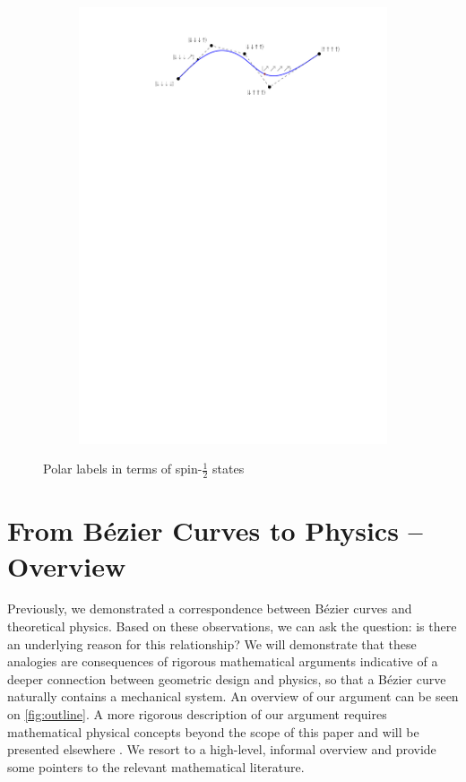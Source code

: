 \documentclass[final,3p,mathptmx]{elsarticle}
\begin{document}
\begin{figure}[h]
	\centering
	\begin{subfigure}{0.6\textwidth}
		\includegraphics[width=\textwidth, keepaspectratio]{figures/polarform_spin.pdf}
	\end{subfigure}
	\caption{Polar labels in terms of spin-$\frac{1}{2}$ states}
	\label{fig:polarform_spin}
\end{figure}

\section{From B\'{e}zier Curves to Physics -- Overview}\label{sec:bezier2physics}
Previously, we demonstrated a correspondence between B\'{e}zier curves and theoretical physics. Based on these observations, we can ask the question: is there an underlying reason for this relationship? We will demonstrate that these analogies are consequences of rigorous mathematical arguments indicative of a deeper connection between geometric design and physics, so that a B\'{e}zier curve naturally contains a mechanical system. An overview of our argument can be seen on \autoref{fig:outline}. A more rigorous description of   our argument requires mathematical physical concepts beyond the scope of this paper and will be presented elsewhere \cite{vaitkus2018physics}. We resort to a high-level, informal overview and provide some pointers to the relevant mathematical literature.
\end{document}
